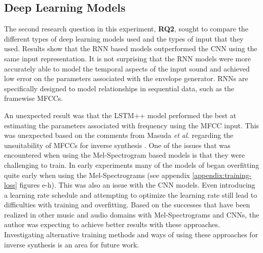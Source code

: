 \subsection{Deep Learning Models}
The second research question in this experiment, \textbf{RQ2}, sought to compare the different types of deep learning models used and the types of input that they used. Results show that the RNN based models outperformed the CNN using the same input representation. It is not surprising that the RNN models were more accurately able to model the temporal aspects of the input sound and achieved low error on the parameters associated with the envelope generator. RNNs are specifically designed to model relationships in sequential data, such as the framewise MFCCs. 

An unexpected result was that the LSTM++ model performed the best at estimating the parameters associated with frequency using the MFCC input. This was unexpected based on the comments from Masuda \textit{et al.} regarding the unsuitability of MFCCs for inverse synthesis \cite{masudo2021quality}. One of the issues that was encountered when using the Mel-Spectrogram based models is that they were challenging to train. In early experiments many of the models of began overfitting quite early when using the Mel-Spectrograms (see appendix \ref{appendix:training-loss} figures e-h). This was also an issue with the CNN models. Even introducing a learning rate schedule and attempting to optimize the learning rate still lead to difficulties with training and overfitting. Based on the successes that have been realized in other music and audio domains with Mel-Spectrograms and CNNs, the author was expecting to achieve better results with these approaches. Investigating alternative training methods and ways of using these approaches for inverse synthesis is an area for future work.


